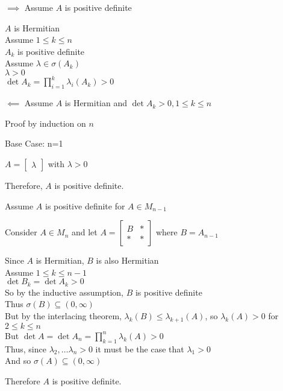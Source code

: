 \documentclass[letterpaper,12pt,fleqn]{article}
\renewcommand{\l}{\lambda}
\renewcommand{\o}{\sigma}
\begin{document}
\begin{theproof}
  \listbreak
  \begin{description}
  \item $\implies$ Assume $A$ is positive definite

    $A$ is Hermitian \\
    Assume $1\le k\le n$ \\
    $A_k$ is positive definite \\
    Assume $\l\in\o(A_k)$ \\
    $\l>0$ \\
    $\det A_k=\prod_{i=1}^k\l_i(A_k)>0$

  \item $\impliedby$ Assume $A$ is Hermitian and $\det A_k>0,1\le k\le n$

    Proof by induction on $n$

    \begin{description}
    \item Base Case: n=1

      $A=\begin{bmatrix} \l \end{bmatrix}$ with $\l>0$

      Therefore, $A$ is positive definite.

    \item Assume $A$ is positive definite for $A\in M_{n-1}$

    \item Consider $A\in M_n$ and let $A=\left[\begin{array}{c|c}
      B & * \\
      \hline
      * & *
      \end{array}\right]$ where $B=A_{n-1}$

      Since $A$ is Hermitian, $B$ is also Hermitian \\
      Assume $1\le k\le n-1$ \\
      $\det B_k=\det A_k>0$ \\
      So by the inductive assumption, $B$ is positive definite \\
      Thus $\o(B)\subseteq(0,\infty)$ \\
      But by the interlacing theorem, $\l_k(B)\le \l_{k+1}(A)$, so $\l_k(A)>0$
      for $2\le k\le n$ \\
      But $\det A=\det A_n=\prod_{k=1}^n\l_k(A)>0$ \\
      Thus, since $\l_2,\ldots\l_n>0$ it must be the case that $\l_1>0$ \\
      And so $\o(A)\subseteq(0,\infty)$

      Therefore $A$ is positive definite.
    \end{description}
  \end{description}
\end{theproof}
\end{document}
